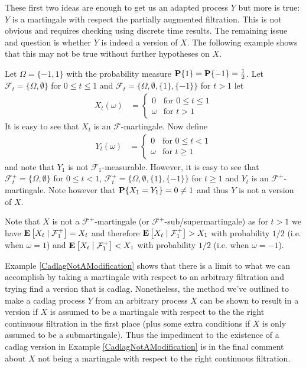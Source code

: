 These first two ideas are enough to get us an adapted process $Y$ but
more is true: $Y$ is a martingale with respect the partially
augmented filtration.  This is not obvious and requires checking using
discrete time results.  The remaining issue and question
is whether $Y$ is indeed a version of $X$.  The following example shows
that this may not be true without further hypotheses on $X$.

\begin{examp}\label{CadlagNotAModification}Let $\Omega = \lbrace -1, 1 \rbrace$ with the probability
  measure $\probability{1} = \probability{-1} = \frac{1}{2}$.  Let
  $\mathcal{F}_t = \lbrace \Omega, \emptyset \rbrace$ for $0 \leq t
  \leq 1$ and $\mathcal{F}_t = \lbrace \Omega, \emptyset, \lbrace 1
  \rbrace, \lbrace -1 \rbrace\rbrace$ for $t > 1$ let 
\begin{align*}
X_t(\omega) &= \begin{cases}
0 & \text{for $0 \leq t \leq 1$} \\
\omega & \text{for $t > 1$}
\end{cases}
\end{align*}
It is easy to see that $X_t$ is an $\mathcal{F}$-martingale.  Now
define 
\begin{align*}
Y_t(\omega) &= \begin{cases}
0 & \text{for $0 \leq t < 1$} \\
\omega & \text{for $t \geq 1$}
\end{cases}
\end{align*}
and note that $Y_1$ is not $\mathcal{F}_1$-measurable.  However, it is
easy to see that 
 $\mathcal{F}^+_t = \lbrace \Omega, \emptyset \rbrace$ for $0 \leq t
  < 1$,  $\mathcal{F}^+_t = \lbrace \Omega, \emptyset, \lbrace 1
  \rbrace, \lbrace -1 \rbrace\rbrace$ for $t \geq 1$ and 
  $Y_t$ is an $\mathcal{F}^+$-martingale.  Note however that
  $\probability{X_1 = Y_1} = 0 \neq 1$ and thus $Y$ is not a version
  of $X$.

Note that $X$ is not a $\mathcal{F}^+$-martingale (or
$\mathcal{F}^+$-sub/supermartingale) as for $t > 1$ we have
$\cexpectationlong{\mathcal{F}^+_1}{X_t} = X_t$ and therefore
$\cexpectationlong{\mathcal{F}^+_1}{X_t}> X_1$ with probability $1/2$
(i.e. when $\omega = 1$)
and $\cexpectationlong{\mathcal{F}^+_1}{X_t} < X_1$ with probability
$1/2$ (i.e. when $\omega = -1$).
\end{examp}

Example \ref{CadlagNotAModification} shows that there is a limit to
what we can accomplish by taking a martingale with respect to an
arbitrary filtration and trying find a version that is cadlag.  
Nonetheless, the method we've outlined to make a cadlag process $Y$
from an arbitrary process $X$ can be shown to result in a version if
$X$ is assumed to be a martingale with respect to the the right continuous
filtration in the first place (plus some extra conditions if $X$ is
only assumed to be a submartingale).  Thus the impediment to the
existence of a cadlag version in Example \ref{CadlagNotAModification}
is in the final comment about $X$ not being a martingale with respect
to the right continuous filtration. 

